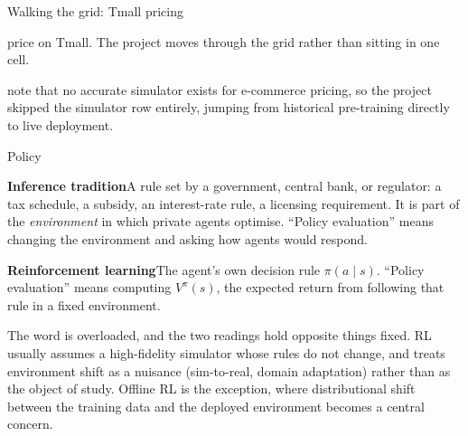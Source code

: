 \begin{frame}{Walking the grid: Tmall pricing}

\citet{Liu2019} price on Tmall. The project moves through the grid rather than
sitting in one cell.

\bigskip
\begin{center}
\end{center}

\bigskip
\citet{Liu2019} note that no accurate simulator exists for e-commerce pricing, so
the project
\alert{skipped the simulator row entirely}, jumping from historical pre-training
directly to live deployment.
\end{frame}

\begin{frame}{Policy}

\textcolor{rlblue}{\textbf{Inference tradition}}\quad A rule set by a government,
central bank, or regulator: a tax schedule, a subsidy, an interest-rate rule, a
licensing requirement. It is part of the \emph{environment} in which private agents
optimise. ``Policy evaluation'' means changing the environment and asking how
agents would respond.

\bigskip
\textcolor{rlorange}{\textbf{Reinforcement learning}}\quad The agent's own decision
rule $\pi(a \mid s)$. ``Policy evaluation'' means computing $V^\pi(s)$, the expected
return from following that rule in a \alert{fixed} environment.

\bigskip
The word is overloaded, and the two readings hold opposite things fixed. RL usually
assumes a high-fidelity simulator whose rules do not change, and treats environment
shift as a nuisance (sim-to-real, domain adaptation) rather than as the object of
study. Offline RL is the exception, where distributional shift between the training
data and the deployed environment becomes a central concern.
\end{frame}

